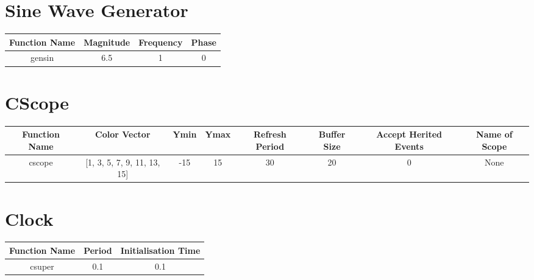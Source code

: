 \documentclass{article}%
\begin{document}
%
\normalsize%
\section{Sine Wave Generator}%
\label{sec:Sine Wave Generator}%
\begin{tabular}{|c|c|c|c|}%
\hline%
Function Name&Magnitude&Frequency&Phase\\%
\hline%
gensin&6.5&1&0\\%
\hline%
\end{tabular}

%
\section{CScope}%
\label{sec:CScope}%
\begin{tabular}{|c|c|c|c|c|c|c|c|}%
\hline%
Function Name&Color Vector&Ymin&Ymax&Refresh Period&Buffer Size&Accept Herited Events& Name of Scope\\%
\hline%
cscope&{[}1, 3, 5, 7, 9, 11, 13, 15{]}&{-}15&15&30&20&0&None\\%
\hline%
\end{tabular}

%
\section{Clock}%
\label{sec:Clock}%
\begin{tabular}{|c|c|c|}%
\hline%
Function Name&Period&Initialisation Time\\%
\hline%
csuper&0.1&0.1\\%
\hline%
\end{tabular}

%
\end{document}

